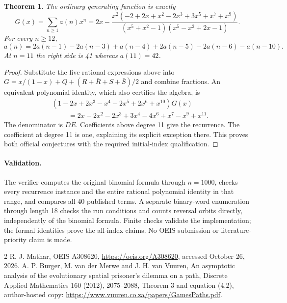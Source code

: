 \documentclass[10pt]{article}
\newtheorem{theorem}{Theorem}
\begin{document}
\begin{theorem}
The ordinary generating function is exactly
\[
 G(x)=\sum_{n\ge1}a(n)x^n
 =2x-\frac{x^2(-2+2x+x^2-2x^3+3x^5+x^7+x^9)}
 {(x^5+x^2-1)(x^5-x^2+2x-1)}.
\]
For every $n\ge12$,
\[
 a(n)=2a(n-1)-2a(n-3)+a(n-4)+2a(n-5)
       -2a(n-6)-a(n-10).
\]
At $n=11$ the right side is 41 whereas $a(11)=42$.
\end{theorem}
\begin{proof}
Substitute the five rational expressions above into
$G=x/(1-x)+Q+(R+\bar R+S+\bar S)/2$ and combine fractions.
An equivalent polynomial identity, which also certifies the algebra,
is
\begin{align*}
 &(1-2x+2x^3-x^4-2x^5+2x^6+x^{10})G(x)\\
 &\hspace{1cm}=2x-2x^2-2x^3+3x^4-4x^6+x^7-x^9+x^{11}.
\end{align*}
The denominator is $DE$. Coefficients above degree 11 give the
recurrence. The coefficient at degree 11 is one, explaining its
explicit exception there. This proves both official conjectures
with the required initial-index qualification.
\end{proof}
\paragraph{Validation.}
The verifier computes the original binomial formula through
$n=1000$, checks every recurrence instance and the entire rational
polynomial identity in that range, and compares all 40 published
terms. A separate binary-word enumeration through length 18 checks
the run conditions and counts reversal orbits directly, independently
of the binomial formula. Finite checks validate the implementation;
the formal identities prove the all-index claims. No OEIS submission
or literature-priority claim is made.
\begin{thebibliography}{2}
 R. J. Mathar, OEIS A308620,
\url{https://oeis.org/A308620}, accessed October 26, 2026.
 A. P. Burger, M. van der Merwe and J. H. van Vuuren,
An asymptotic analysis of the evolutionary spatial prisoner's dilemma
on a path, Discrete Applied Mathematics 160 (2012), 2075--2088,
Theorem 3 and equation (4.2), author-hosted copy:
\url{https://www.vuuren.co.za/papers/GamesPaths.pdf}.
\end{thebibliography}
\end{document}
